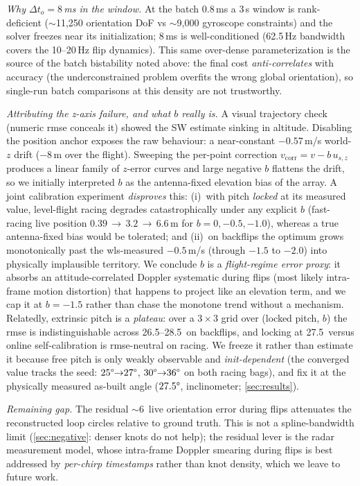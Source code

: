 \emph{Why $\Delta t_o{=}8$\,ms in the window.}
At the batch $0.8$\,ms a 3\,s window is rank-deficient
($\sim$11{,}250 orientation DoF vs $\sim$9{,}000 gyroscope constraints) and
the solver freezes near its initialization; 8\,ms is well-conditioned
(62.5\,Hz bandwidth covers the 10--20\,Hz flip dynamics).
This same over-dense parameterization is the source of the batch bistability noted
above: the final cost \emph{anti-correlates} with accuracy (the
underconstrained problem overfits the wrong global orientation), so
single-run batch comparisons at this density are not trustworthy.

\emph{Attributing the z-axis failure, and what $b$ really is.}
A visual trajectory check (numeric \ac{rmse} conceals it) showed the SW
estimate sinking in altitude.  Disabling the position anchor exposes
the raw behaviour: a near-constant $-0.57$\,m/s world-$z$ drift
($-8$\,m over the flight).  Sweeping the per-point correction
$v_{\mathrm{corr}} = v - b\,u_{s,z}$ produces a linear family of
$z$-error curves and large negative $b$ flattens the drift, so we
initially interpreted $b$ as the antenna-fixed elevation bias of the
array.  A joint calibration experiment \emph{disproves} this: (i)~with pitch
\emph{locked} at its measured value, level-flight racing degrades
catastrophically under any explicit $b$ (fast-racing live position
$0.39\,{\to}\,3.2\,{\to}\,6.6$\,m for $b{=}0,-0.5,-1.0$), whereas a true
antenna-fixed bias would be tolerated; and (ii)~on backflips the optimum
grows monotonically past the \ac{wls}-measured $-0.5$\,m/s (through $-1.5$
to $-2.0$) into physically implausible territory.
We conclude $b$ is a \emph{flight-regime error proxy}: it absorbs
an attitude-correlated Doppler systematic during flips (most likely
intra-frame motion distortion) that happens to project like an
elevation term, and we cap it at $b{=}{-}1.5$ rather than chase
the monotone trend without a mechanism.
Relatedly, extrinsic pitch is a \emph{plateau}: over a $3{\times}3$ grid
over (locked pitch, $b$) the \ac{rmse} is indistinguishable across
26.5--28.5\degree\ on backflips, and locking at 27.5\degree\ versus
online self-calibration is \ac{rmse}-neutral on racing.  We freeze it
rather than estimate it because free pitch is only weakly observable and
\emph{init-dependent} (the converged value tracks the seed:
$25\degree{\to}27\degree$, $30\degree{\to}36\degree$ on both racing bags),
and fix it at the physically measured as-built angle ($27.5\degree$,
inclinometer; \autoref{sec:results}).

\emph{Remaining gap.}
The residual $\sim$6\degree\ live orientation error during flips
attenuates the reconstructed loop circles relative to ground truth.
This is not a spline-bandwidth limit (\autoref{sec:negative}: denser
knots do not help); the residual lever is the radar measurement model,
whose intra-frame Doppler smearing during flips is best addressed by
\emph{per-chirp timestamps} rather than knot density, which we leave to
future work.


